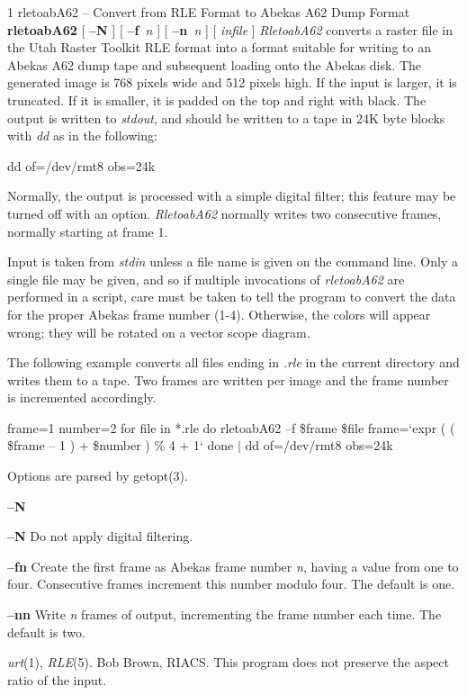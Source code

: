 %
%
%
 1
rletoabA62 -- Convert from RLE Format to Abekas A62 Dump Format
{\bf rletoabA62}
[
{\bf --N}
] [
{\bf --f}{\it \ n}
] [
{\bf --n}{\it \ n}
] [
{\it infile}
]
{\it RletoabA62}
converts a raster file in the Utah Raster Toolkit RLE format into a format
suitable for writing to an Abekas A62 dump tape and subsequent loading onto the
Abekas disk.
The generated image is 768 pixels wide and 512 pixels high.
If the input is larger, it is truncated.
If it is smaller, it is padded on the top and right with black.
The output is written to
{\it stdout}{\rm ,}
and should be written to a tape in 24K byte blocks with
{\it dd}
as in the following:
\par\noindent
	dd of=/dev/rmt8 obs=24k
\par\noindent
Normally, the output is processed with a simple digital filter; this feature
may be turned off with an option.
{\it RletoabA62}
normally writes two consecutive frames, normally starting at frame 1.
\par\noindent
Input is taken from
{\it stdin}
unless a file name is given on the command line.
Only a single file may be given, and so if multiple invocations of
{\it rletoabA62}
are performed in a script, care must be taken to tell the program to convert
the data for the proper Abekas frame number (1-4).
Otherwise, the colors will appear wrong; they will be rotated on a vector scope
diagram.
\par\noindent
The following example converts all files ending in
{\it .rle}
in the current directory and writes them to a tape.
Two frames are written per image and the frame number is incremented
accordingly.
\par\noindent
\ind{1.0in}
frame=1
\nwl
number=2
\nwl
for file in *.rle
\nwl
do
\nwl
	rletoabA62 --f \$frame \$file
\nwl
	frame=`expr \bs ( \bs ( \$frame -- 1 \bs ) + \$number \bs ) \% 4 + 1`
\nwl
done $|$
\nwl
dd of=/dev/rmt8 obs=24k
\ind{0.0em}
\par\noindent
Options are parsed by getopt(3).
\begin{TPlist}{{\bf --N}
}
\item[{{\bf --N}
}]
Do not apply digital filtering.
\item[{{\bf --f}{\it }{\bf n}
}]
Create the first frame as Abekas frame number
{\it n}{\rm ,}
having a value from one to four.
Consecutive frames increment this number modulo four.
The default is one.
\item[{{\bf --n}{\it }{\bf n}
}]
Write
{\it n}
frames of output, incrementing the frame number each time.
The default is two.
\end{TPlist}
{\it urt}{\rm (1),}
{\it RLE}{\rm (5).}
Bob Brown, RIACS.
This program does not preserve the aspect ratio of the input.
\newpage


